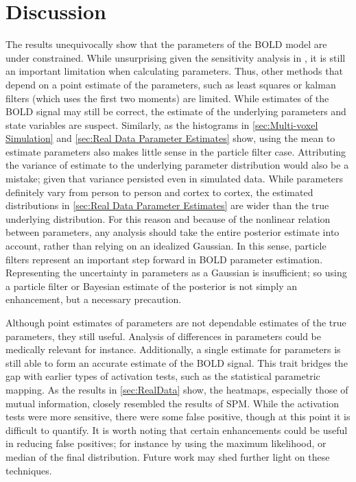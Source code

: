 \chapter{Discussion}
The results unequivocally show that the parameters of the BOLD model are under
constrained. While unsurprising given the sensitivity analysis in \cite{Deneux2006},
it is still an important limitation when calculating parameters. Thus, other methods
that depend on a point estimate of the parameters, such as least squares 
or kalman filters (which uses the first two moments) are limited. While estimates of
the  BOLD signal may still be correct, the estimate
of the underlying parameters and state variables are suspect. Similarly, as the
histograms in \autoref{sec:Multi-voxel Simulation} and \autoref{sec:Real Data Parameter Estimates}
show, using the mean to estimate parameters also makes little sense in the particle filter
case. Attributing the variance of estimate to the underlying parameter distribution would
also be a mistake; given that variance persisted even in simulated data. While parameters 
definitely vary from person to person and cortex to cortex, the estimated distributions 
in \autoref{sec:Real Data Parameter Estimates} are wider than the true underlying 
distribution. For this reason and because of the nonlinear relation between
parameters, any analysis should take the entire posterior estimate into account, 
rather than relying on an idealized Gaussian. In this sense, particle filters represent
an important step forward in BOLD parameter estimation. Representing
the uncertainty in parameters as a Gaussian is insufficient; so using a particle filter
or Bayesian estimate of the posterior is not simply an enhancement, but a necessary precaution.

Although point estimates of parameters are not dependable estimates of the 
true parameters, they still useful. Analysis of differences in parameters
could be medically relevant for instance. Additionally, a single estimate for parameters is still able
to form an accurate estimate of the BOLD signal. This trait bridges the gap with earlier types 
of activation tests, such as the statistical
parametric mapping. As the results in \autoref{sec:RealData} show, the heatmaps, especially
those of mutual information, closely resembled the results of SPM. While the activation
tests were more sensitive, there were some false positive, though at this point it is
difficult to quantify. It is
worth noting that certain enhancements could be useful in reducing false positives; for instance
by using the maximum likelihood, or median of the final distribution.  Future work may 
shed further light on these techniques. 

